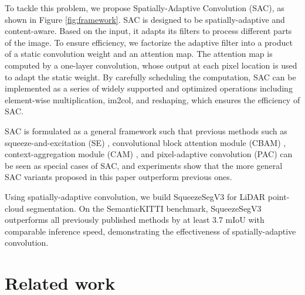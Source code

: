 \documentclass[runningheads]{llncs}
\begin{document}
To tackle this problem, we propose Spatially-Adaptive Convolution (SAC), as shown in Figure \ref{fig:framework}. SAC is designed to be spatially-adaptive and content-aware. Based on the input, it adapts its filters to process different parts of the image. To ensure efficiency, we factorize the adaptive filter into a product of a static convolution weight and an attention map. The attention map is computed by a one-layer convolution, whose output at each pixel location is used to adapt the static weight. By carefully scheduling the computation, SAC can be implemented as a series of widely supported and optimized operations including element-wise multiplication, im2col, and reshaping, which ensures the efficiency of SAC.

SAC is formulated as a general framework such that previous methods such as squeeze-and-excitation (SE) \cite{hu2018squeeze}, convolutional block attention module (CBAM) \cite{woo2018cbam}, context-aggregation module (CAM) \cite{wu2018squeezesegv2}, and pixel-adaptive convolution (PAC) \cite{su2019pixel} can be seen as special cases of SAC, and experiments show that the more general SAC variants proposed in this paper outperform previous ones.

Using spatially-adaptive convolution, we build SqueezeSegV3 for LiDAR point-cloud segmentation. On the SemanticKITTI benchmark, SqueezeSegV3 outperforms all previously published methods by at least 3.7 mIoU with comparable inference speed, demonstrating the effectiveness of spatially-adaptive convolution. 


















\section{Related work}
\end{document}
